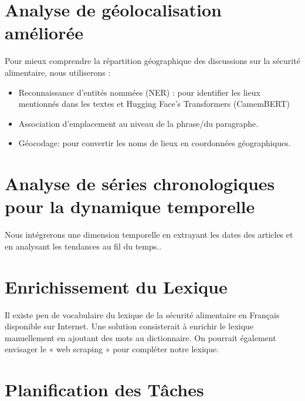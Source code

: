 \documentclass{article}
\begin{document}
\section{Analyse de géolocalisation améliorée}
Pour mieux comprendre la répartition géographique des discussions sur la sécurité alimentaire, nous utiliserons :
\begin{itemize}
\item Reconnaissance d'entités nommées (NER) : pour identifier les lieux mentionnés dans les textes et Hugging Face’s Transformers (CamemBERT)
\item Association d'emplacement au niveau de la phrase/du paragraphe.
\item Géocodage: pour convertir les noms de lieux en coordonnées géographiques.
\end{itemize}

\section{Analyse de séries chronologiques pour la dynamique temporelle}
Nous intégrerons une dimension temporelle en extrayant les dates des articles et en analysant les tendances au fil du temps..


\section*{Enrichissement du Lexique}
Il existe peu de vocabulaire du lexique de la sécurité alimentaire en Français disponible sur Internet. Une solution consisterait à enrichir le lexique manuellement en ajoutant des mots au dictionnaire. On pourrait également envisager le « web scraping » pour compléter notre lexique.


\section*{Planification des Tâches}
\end{document}

